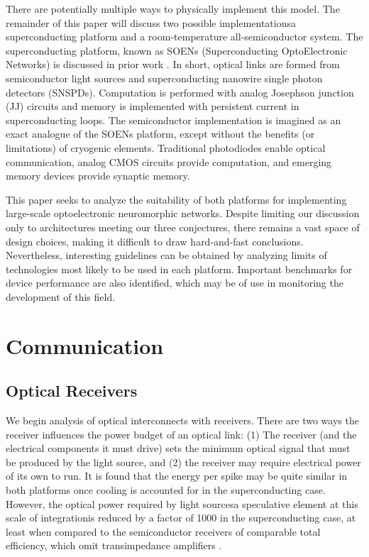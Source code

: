 \documentclass[twocolumn]{article}
\begin{document}
There are potentially multiple ways to physically implement this model. The remainder of this paper will discuss two possible implementations\textemdash a superconducting platform and a room-temperature all-semiconductor system. The superconducting platform, known as SOENs (Superconducting OptoElectronic Networks) is discussed in prior work \cite{shainline2017superconducting, shainline2019superconducting, shainline2019fluxonic, sh2021}. In short, optical links are formed from semiconductor light sources and superconducting nanowire single photon detectors (SNSPDs). Computation is performed with analog Josephson junction (JJ) circuits and memory is implemented with persistent current in superconducting loops. The semiconductor implementation is imagined as an exact analogue of the SOENs platform, except without the benefits (or limitations) of cryogenic elements. Traditional photodiodes enable optical communication, analog CMOS circuits provide computation, and emerging memory devices provide synaptic memory.

This paper seeks to analyze the suitability of both platforms for implementing large-scale optoelectronic neuromorphic networks. Despite limiting our discussion only to architectures meeting our three conjectures, there remains a vast space of design choices, making it difficult to draw hard-and-fast conclusions. Nevertheless, interesting guidelines can be obtained by analyzing limits of technologies most likely to be used in each platform. Important benchmarks for device performance are also identified, which may be of use in monitoring the development of this field.

\section{\label{sec:communication}Communication}
\subsection{Optical Receivers}
We begin analysis of optical interconnects with receivers. There are two ways the receiver influences the power budget of an optical link: (1) The receiver (and the electrical components it must drive) sets the minimum optical signal that must be produced by the light source, and (2) the receiver may require electrical power of its own to run. It is found that the energy per spike may be quite similar in both platforms once cooling is accounted for in the superconducting case. However, the optical power required by light sources\textemdash a speculative element at this scale of integration\textemdash is reduced by a factor of 1000 in the superconducting case, at least when compared to the semiconductor receivers of comparable total efficiency, which omit transimpedance amplifiers \cite{miller2017attojoule}.
\end{document}

